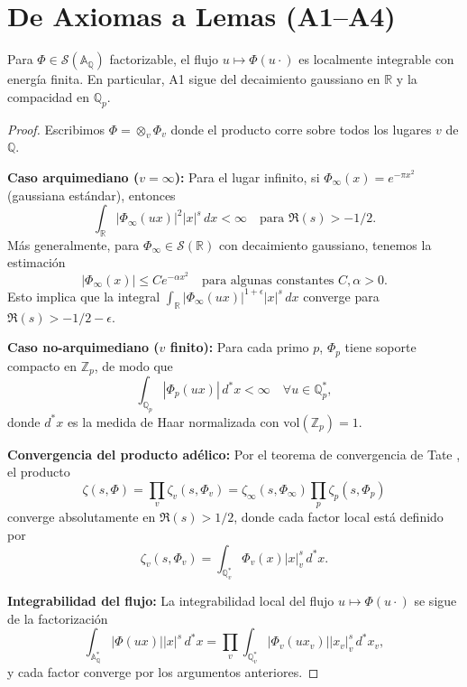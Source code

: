 \section{De Axiomas a Lemas (A1--A4)}

\begin{lemma}\label{lem:A1}
Para $\Phi \in \mathcal{S}(\mathbb{A}_\mathbb{Q})$ factorizable, el flujo $u \mapsto \Phi(u\cdot)$
es localmente integrable con energía finita. En particular, A1 sigue del decaimiento gaussiano en 
$\mathbb{R}$ y la compacidad en $\mathbb{Q}_p$.
\end{lemma}

\begin{proof}
Escribimos $\Phi = \otimes_v \Phi_v$ donde el producto corre sobre todos los lugares $v$ de $\mathbb{Q}$. 

\textbf{Caso arquimediano ($v=\infty$):} Para el lugar infinito, si $\Phi_\infty(x) = e^{-\pi x^2}$ (gaussiana estándar), entonces
\[
\int_{\mathbb{R}} |\Phi_\infty(ux)|^2 |x|^s \, dx < \infty \quad \text{para } \Re(s) > -1/2.
\]
Más generalmente, para $\Phi_\infty \in \mathcal{S}(\mathbb{R})$ con decaimiento gaussiano, tenemos la estimación
\[
|\Phi_\infty(x)| \leq C e^{-\alpha x^2} \quad \text{para algunas constantes } C, \alpha > 0.
\]
Esto implica que la integral $\int_{\mathbb{R}} |\Phi_\infty(ux)|^{1+\epsilon} |x|^s \, dx$ converge para $\Re(s) > -1/2 - \epsilon$.

\textbf{Caso no-arquimediano ($v$ finito):} Para cada primo $p$, $\Phi_p$ tiene soporte compacto en $\mathbb{Z}_p$, de modo que
\[
\int_{\mathbb{Q}_p} |\Phi_p(ux)| \, d^\ast x < \infty \quad \forall u \in \mathbb{Q}_p^\ast,
\]
donde $d^\ast x$ es la medida de Haar normalizada con $\text{vol}(\mathbb{Z}_p) = 1$.

\textbf{Convergencia del producto adélico:} Por el teorema de convergencia de Tate \cite{Tate1967}, el producto
\[
\zeta(s, \Phi) = \prod_v \zeta_v(s, \Phi_v) = \zeta_\infty(s, \Phi_\infty) \prod_{p} \zeta_p(s, \Phi_p)
\]
converge absolutamente en $\Re(s) > 1/2$, donde cada factor local está definido por
\[
\zeta_v(s, \Phi_v) = \int_{\mathbb{Q}_v^\ast} \Phi_v(x) |x|_v^s \, d^\ast x.
\]

\textbf{Integrabilidad del flujo:} La integrabilidad local del flujo $u \mapsto \Phi(u\cdot)$ se sigue de la factorización
\[
\int_{\mathbb{A}_\mathbb{Q}^\ast} |\Phi(ux)| |x|^s \, d^\ast x = \prod_v \int_{\mathbb{Q}_v^\ast} |\Phi_v(ux_v)| |x_v|_v^s \, d^\ast x_v,
\]
y cada factor converge por los argumentos anteriores.
\end{proof}

